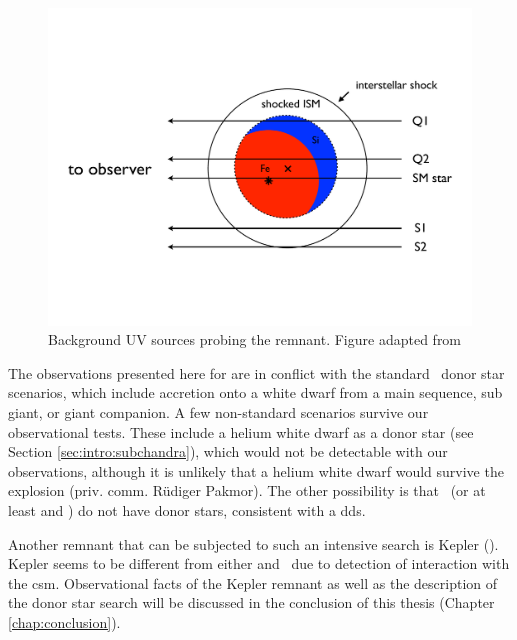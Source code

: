 \begin{figure}[tb] %
   \centering
   \includegraphics[width=\textwidth]{chapter_sn1006/plots/Winkler2005_probingsn1006_cropped.pdf} 
   \caption[Background UV sources probing the remnant]{Background UV sources probing the remnant. Figure adapted from \citet{2005ApJ...624..189W}}
   \label{fig:sn1006_uvprobe}
\end{figure}

The observations presented here for  are in conflict with the standard \snia\ donor star scenarios, which include accretion onto a white dwarf from a main sequence, sub giant, or giant companion. 
A few non-standard scenarios survive our observational tests. These include a helium white dwarf as a donor star (see Section \ref{sec:intro:subchandra}), which would not be detectable with our observations, although it is unlikely that a helium white dwarf would survive the explosion (priv. comm. R\"udiger Pakmor). The other possibility is that \sneia\ (or at least  and ) do not have donor stars, consistent with a \gls{dds}.

Another remnant that can be subjected to such an intensive search is Kepler (). Kepler seems to be different from either  and \ due to detection of interaction with the \gls{csm}. Observational facts of the Kepler remnant  as well as the description of the donor star search will be discussed in the conclusion of this thesis (Chapter \ref{chap:conclusion}).

